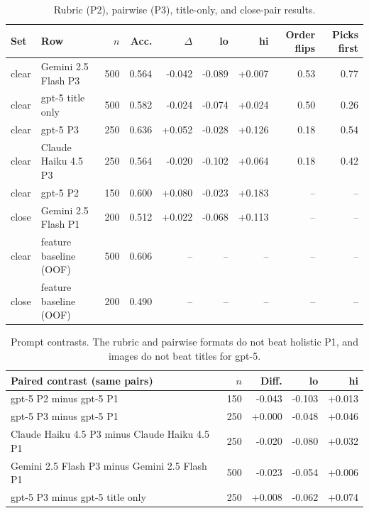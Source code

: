\documentclass[10pt]{article}
\begin{document}
\begin{table}[h]\centering\small
\caption{Rubric (P2), pairwise (P3), title-only, and close-pair results.}
\begin{tabular}{llrrrrrrr}
\toprule
Set & Row & $n$ & Acc. & $\Delta$ & lo & hi & Order flips & Picks first \\
\midrule
clear & Gemini 2.5 Flash P3 & 500 & 0.564 & -0.042 & -0.089 & +0.007 & 0.53 & 0.77 \\
clear & gpt-5 title only & 500 & 0.582 & -0.024 & -0.074 & +0.024 & 0.50 & 0.26 \\
clear & gpt-5 P3 & 250 & 0.636 & +0.052 & -0.028 & +0.126 & 0.18 & 0.54 \\
clear & Claude Haiku 4.5 P3 & 250 & 0.564 & -0.020 & -0.102 & +0.064 & 0.18 & 0.42 \\
clear & gpt-5 P2 & 150 & 0.600 & +0.080 & -0.023 & +0.183 & -- & -- \\
close & Gemini 2.5 Flash P1 & 200 & 0.512 & +0.022 & -0.068 & +0.113 & -- & -- \\
clear & feature baseline (OOF) & 500 & 0.606 & -- & -- & -- & -- & -- \\
close & feature baseline (OOF) & 200 & 0.490 & -- & -- & -- & -- & -- \\
\bottomrule
\end{tabular}
\end{table}

\begin{table}[h]\centering\small
\caption{Prompt contrasts. The rubric and pairwise formats do not beat holistic P1, and images do not beat titles for gpt-5.}
\begin{tabular}{lrrrr}
\toprule
Paired contrast (same pairs) & $n$ & Diff. & lo & hi \\
\midrule
gpt-5 P2 minus gpt-5 P1 & 150 & -0.043 & -0.103 & +0.013 \\
gpt-5 P3 minus gpt-5 P1 & 250 & +0.000 & -0.048 & +0.046 \\
Claude Haiku 4.5 P3 minus Claude Haiku 4.5 P1 & 250 & -0.020 & -0.080 & +0.032 \\
Gemini 2.5 Flash P3 minus Gemini 2.5 Flash P1 & 500 & -0.023 & -0.054 & +0.006 \\
gpt-5 P3 minus gpt-5 title only & 250 & +0.008 & -0.062 & +0.074 \\
\bottomrule
\end{tabular}
\end{table}
\end{document}

